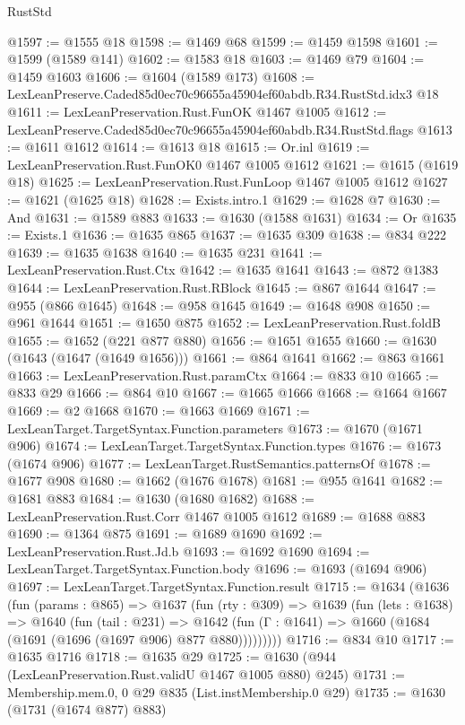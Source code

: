 \begin{lexlean}{RustStd}
\begin{coremodule}
@1597 := @1555 @18
@1598 := @1469 @68
@1599 := @1459 @1598
@1601 := @1599 (@1589 @141)
@1602 := @1583 @18
@1603 := @1469 @79
@1604 := @1459 @1603
@1606 := @1604 (@1589 @173)
@1608 := LexLeanPreserve.Caded85d0ec70c96655a45904ef60abdb.R34.RustStd.idx3 @18
@1611 := LexLeanPreservation.Rust.FunOK @1467 @1005
@1612 := LexLeanPreserve.Caded85d0ec70c96655a45904ef60abdb.R34.RustStd.flags
@1613 := @1611 @1612
@1614 := @1613 @18
@1615 := Or.inl
@1619 := LexLeanPreservation.Rust.FunOK0 @1467 @1005 @1612
@1621 := @1615 (@1619 @18)
@1625 := LexLeanPreservation.Rust.FunLoop @1467 @1005 @1612
@1627 := @1621 (@1625 @18)
@1628 := Exists.intro.{1}
@1629 := @1628 @7
@1630 := And
@1631 := @1589 @883
@1633 := @1630 (@1588 @1631)
@1634 := Or
@1635 := Exists.{1}
@1636 := @1635 @865
@1637 := @1635 @309
@1638 := @834 @222
@1639 := @1635 @1638
@1640 := @1635 @231
@1641 := LexLeanPreservation.Rust.Ctx
@1642 := @1635 @1641
@1643 := @872 @1383
@1644 := LexLeanPreservation.Rust.RBlock
@1645 := @867 @1644
@1647 := @955 (@866 @1645)
@1648 := @958 @1645
@1649 := @1648 @908
@1650 := @961 @1644
@1651 := @1650 @875
@1652 := LexLeanPreservation.Rust.foldB
@1655 := @1652 (@221 @877 @880)
@1656 := @1651 @1655
@1660 := @1630 (@1643 (@1647 (@1649 @1656)))
@1661 := @864 @1641
@1662 := @863 @1661
@1663 := LexLeanPreservation.Rust.paramCtx
@1664 := @833 @10
@1665 := @833 @29
@1666 := @864 @10
@1667 := @1665 @1666
@1668 := @1664 @1667
@1669 := @2 @1668
@1670 := @1663 @1669
@1671 := LexLeanTarget.TargetSyntax.Function.parameters
@1673 := @1670 (@1671 @906)
@1674 := LexLeanTarget.TargetSyntax.Function.types
@1676 := @1673 (@1674 @906)
@1677 := LexLeanTarget.RustSemantics.patternsOf
@1678 := @1677 @908
@1680 := @1662 (@1676 @1678)
@1681 := @955 @1641
@1682 := @1681 @883
@1684 := @1630 (@1680 @1682)
@1688 := LexLeanPreservation.Rust.Corr @1467 @1005 @1612
@1689 := @1688 @883
@1690 := @1364 @875
@1691 := @1689 @1690
@1692 := LexLeanPreservation.Rust.Jd.b
@1693 := @1692 @1690
@1694 := LexLeanTarget.TargetSyntax.Function.body
@1696 := @1693 (@1694 @906)
@1697 := LexLeanTarget.TargetSyntax.Function.result
@1715 := @1634
    (@1636
      (fun (params : @865) =>
      @1637
        (fun (rty : @309) =>
        @1639
          (fun (lets : @1638) =>
          @1640
            (fun (tail : @231) =>
            @1642 (fun (Γ : @1641) => @1660 (@1684 (@1691 (@1696 (@1697 @906) @877 @880)))))))))
@1716 := @834 @10
@1717 := @1635 @1716
@1718 := @1635 @29
@1725 := @1630 (@944 (LexLeanPreservation.Rust.validU @1467 @1005 @880) @245)
@1731 := Membership.mem.{0, 0} @29 @835 (List.instMembership.{0} @29)
@1735 := @1630 (@1731 (@1674 @877) @883)

\end{coremodule}
\end{lexlean}
